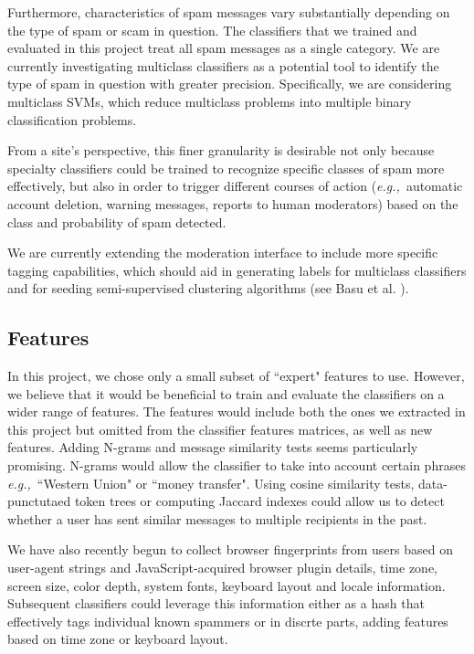 \documentclass[preprint]{acm_proc_article-sp}
\newcommand{\eg}{{\em e.g.,}~}
\begin{document}
Furthermore, characteristics of spam messages vary substantially depending on the type of spam or scam in question. 
The classifiers that we trained and evaluated in this project treat all spam messages as a single category. We are currently 
investigating multiclass classifiers as a potential tool to identify the type of 
spam in question with greater precision. Specifically, we are considering multiclass SVMs, which reduce 
multiclass problems into multiple binary classification problems.\cite{duan} 

From a site's perspective, this finer granularity is desirable not only 
because specialty classifiers could be trained to recognize specific classes of spam more effectively, but also in order to 
trigger different courses of action (\eg automatic account deletion, warning messages, reports to human moderators) 
based on the class and probability of spam detected.

We are currently extending the moderation interface to include more specific tagging capabilities, which should aid 
in generating labels for multiclass classifiers and for seeding semi-supervised clustering algorithms (see Basu et al. 
\cite{basu}).

\subsection{Features}

In this project, we chose only a small subset of ``expert" features to use. However, we believe that 
it would be beneficial to train and evaluate the classifiers on a wider range of features. The features 
would include both the ones we extracted in this project but omitted from the classifier features matrices, 
as well as new features. Adding N-grams and message similarity tests seems particularly promising. 
N-grams would allow the classifier to take into account certain phrases \eg{``Western Union" or ``money transfer"}. 
Using cosine similarity tests, data-punctutaed token trees or computing Jaccard indexes could allow us to 
detect whether a user has sent similar messages to multiple recipients in the past.

We have also recently begun to collect browser fingerprints from users based on user-agent strings 
and JavaScript-acquired browser plugin details, time zone, screen size, color depth, system fonts, 
keyboard layout and locale information. Subsequent classifiers could leverage this information either 
as a hash that effectively tags individual known spammers or in discrte parts, adding features based on 
time zone or keyboard layout.
\end{document}
